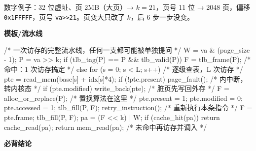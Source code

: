 \documentclass[10pt,a4paper]{ctexart}
\begin{document}
数字例子：32 位虚址、页 2MB（大页）→ $k=21$，页号 11 位 → 2048 页，偏移 \texttt{0x1FFFFF}，页号 \texttt{va>>21}。页变大只改了 $k$，后 6 步一步没变。

\textbf{模板/流水线}

\begin{codebox}
/* 一次访存的完整流水线，任何一支都可能被单独提问 */
W = va & (page_size - 1);
P = va >> k;
if (tlb_tag(P) == P && tlb_valid(P)) {
    F = tlb_frame(P);                       /* 命中：1 次访存搞定 */
} else {
    for (s = 0; s < L; s++)                 /* 逐级查表，L 次访存 */
        pte = read_mem(base[s] + idx[s]*4);
    if (!pte.present) {
        page_fault();                       /* 内中断，转内核态 */
        if (pte.modified) write_back(pte);   /* 脏页先写回外存 */
        F = alloc_or_replace(P);            /* 置换算法在这里 */
        pte.present = 1; pte.modified = 0; pte.accessed = 1;
        tlb_fill(P, F);
        retry_instruction();                /* 重新执行本条指令 */
    }
    F = pte.frame; tlb_fill(P, F);
}
pa = (F << k) | W;
if (cache_hit(pa)) return cache_read(pa);
return mem_read(pa);                        /* 未命中再访存并调入 */
\end{codebox}




\textbf{必背结论}
\end{document}

